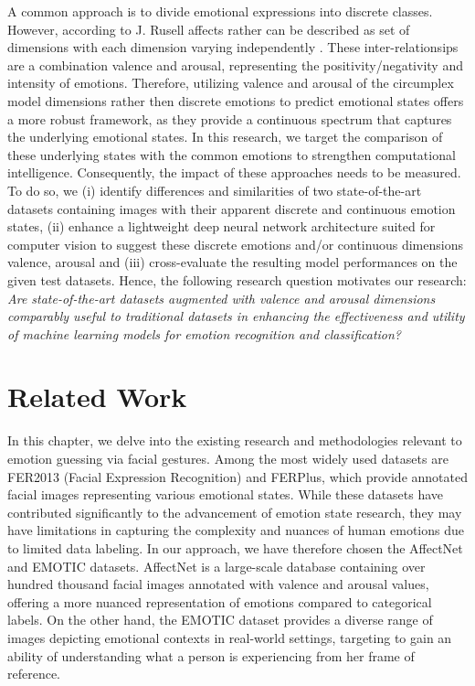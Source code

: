 \documentclass[conference]{IEEEtran}
\begin{document}
A common approach is to divide emotional expressions into discrete classes. However, according to J. Rusell affects rather can be described as set of dimensions with each dimension varying independently \cite{rusellmodell}. These inter-relationsips are a combination valence and arousal, representing the positivity/negativity and intensity of emotions. Therefore, utilizing valence and arousal of the circumplex model dimensions rather then discrete emotions to predict emotional states offers a more robust framework, as they provide a continuous spectrum that captures the underlying emotional states. In this research, we target the comparison of these underlying states with the common emotions to strengthen computational intelligence. Consequently, the impact of these approaches needs to be measured. To do so, we (i) identify differences and similarities of two state-of-the-art datasets containing images with their apparent discrete and continuous emotion states, (ii) enhance a lightweight deep neural network architecture suited for computer vision to suggest these discrete emotions and/or continuous dimensions valence, arousal and (iii) cross-evaluate the resulting model performances on the given test datasets. Hence, the following research question motivates our research: \\

\textit{Are state-of-the-art datasets augmented with valence and arousal dimensions comparably useful to traditional datasets in enhancing the effectiveness and utility of machine learning models for emotion recognition and classification?}



\section{Related Work} \label{relatedwork}

In this chapter, we delve into the existing research and methodologies relevant to emotion guessing via facial gestures. 
Among the most widely used datasets are FER2013 (Facial Expression Recognition) and FERPlus, which provide annotated facial images representing various emotional states. While these datasets have contributed significantly to the advancement of emotion state research, they may have limitations in capturing the complexity and nuances of human emotions due to limited data labeling. In our approach, we have therefore chosen the AffectNet \cite{mollahosseini2017affectnet} and EMOTIC \cite{emotic_pami2019} datasets. AffectNet is a large-scale database containing over hundred thousand facial images annotated with valence and arousal values, offering a more nuanced representation of emotions compared to categorical labels. On the other hand, the EMOTIC dataset provides a diverse range of images depicting emotional contexts in real-world settings, targeting to gain an ability of understanding what a person is experiencing from her frame of reference.
\end{document}
